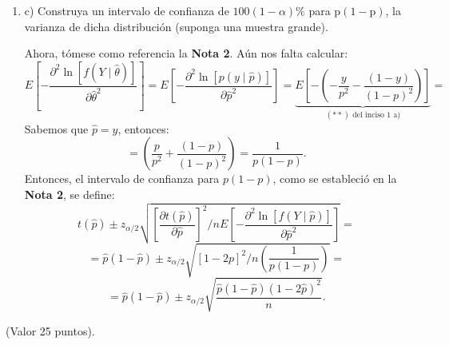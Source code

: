 \begin{enumerate}
\begin{solution}
	\end{solution}
	\item c) Construya un intervalo de confianza de $100(1-\alpha) \%$ para $\mathrm{p}(1-\mathrm{p})$, la varianza de dicha distribución (suponga una muestra grande).
	\begin{solution}
		Ahora, tómese como referencia la \textbf{Nota 2}. Aún nos falta calcular: 
		$$E\left[-\frac{\partial^{2} \ln [f(Y \mid \hat{\theta})]}{\partial \hat{\theta}^{2}}\right]=E\left[-\frac{\partial^{2} \ln [p(y \mid \hat{p})]}{\partial \hat{p}^{2}}\right]=\underbrace{E\left[-\left(-\frac{y}{p^2}-\frac{(1-y)}{(1-p)^2}\right)\right]}_{\text{$(**)$ del inciso 1 a)}}=$$
		Sabemos que $\hat{p}=y$, entonces:
		$$=\left(\frac{p}{p^2}+\frac{(1-p)}{(1-p)^2}\right)=\frac{1}{p(1-p)}.$$
		Entonces, el intervalo de confianza para $p(1-p)$, como se estableció en la \textbf{Nota 2}, se define:
		$$t(\hat{p})\pm z_{\alpha/2}\sqrt{\left[\frac{\partial t(\hat{p})}{\partial \hat{p}}\right]^{2} \Big/ n E\left[-\frac{\partial^{2} \ln [f(Y \mid \hat{p})]}{\partial \hat{p}^{2}}\right]}=$$
		$$=\hat{p}(1-\hat{p})\pm z_{\alpha/2}\sqrt{\left[1-2p\right]^{2} \Big/ n \left(\frac{1}{p(1-p)}\right)}=$$
		$$=\hat{p}(1-\hat{p})\pm z_{\alpha/2}\sqrt{\frac{\hat{p}(1-\hat{p})(1-2\hat{p})^2}{n}}.$$
	\end{solution}
\end{enumerate}
 (Valor 25 puntos).
